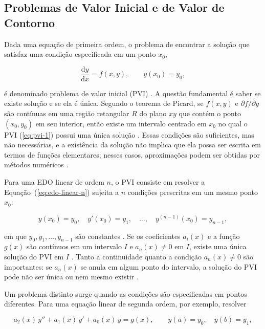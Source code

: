 \documentclass[arial,centeredequations,english,brazilian,oneside,section=TITLE]{ifes8}
\begin{document}
\subsection{Problemas de Valor Inicial e de Valor de Contorno}
\label{sub:pvi-pvc}
 
Dada uma equação de primeira ordem, o problema de encontrar a solução que satisfaz uma
condição especificada em um ponto $x_0$,

\begin{equation}
  \label{eq:pvi-1}
  \frac{\mathrm{d}y}{\mathrm{d}x} = f(x, y), \qquad y(x_0) = y_0,
\end{equation}

é denominado problema de valor inicial (PVI) \cite{Zill2001v1}. A questão
fundamental é saber se existe solução e se ela é única. Segundo o teorema de Picard, se
$f(x, y)$ e $\partial f/\partial y$ são contínuas em uma região retangular $R$ do
plano $xy$ que contém o ponto $(x_0, y_0)$ em seu interior, então existe um intervalo
centrado em $x_0$ no qual o PVI (\ref{eq:pvi-1}) possui uma única solução
\cite{Zill2001v1}. Essas condições são suficientes, mas não necessárias, e a
existência da solução não implica que ela possa ser escrita em termos de funções
elementares; nesses casos, aproximações podem ser obtidas por métodos numéricos
\cite{Zill2001v1}.
 
Para uma EDO linear de ordem $n$, o PVI consiste em resolver a
Equação~(\ref{eq:edo-linear-n}) sujeita a $n$ condições prescritas em um mesmo ponto
$x_0$:

\begin{equation}
  \label{eq:pvi-n}
  y(x_0) = y_0, \quad y'(x_0) = y_1, \quad \ldots, \quad y^{(n-1)}(x_0) = y_{n-1},
\end{equation}

em que $y_0, y_1, \ldots, y_{n-1}$ são constantes \cite{Zill2001v1}. Se os
coeficientes $a_i(x)$ e a função $g(x)$ são contínuos em um intervalo $I$ e
$a_n(x) \neq 0$ em $I$, existe uma única solução do PVI em $I$
\cite{Zill2001v1}. Tanto a continuidade quanto a condição $a_n(x) \neq 0$ são
importantes: se $a_n(x)$ se anula em algum ponto do intervalo, a solução do PVI pode
não ser única ou nem mesmo existir \cite{Zill2001v1}.
 
Um problema distinto surge quando as condições são especificadas em pontos diferentes.
Para uma equação linear de segunda ordem, por exemplo, resolver

\begin{equation}
  \label{eq:pvc}
  a_2(x)\,y'' + a_1(x)\,y' + a_0(x)\,y = g(x), \qquad y(a) = y_0, \quad y(b) = y_1,
\end{equation}
\end{document}
